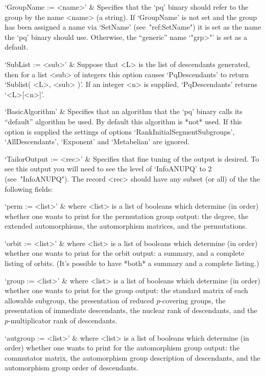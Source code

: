 `GroupName := <name>' &
Specifies that the `pq' binary should refer to  the  group  by  the  name
<name> (a string). If `GroupName' is not  set  and  the  group  has  been
assigned a name via `SetName' (see~"ref:SetName") it is set as  the  name
the `pq' binary should use. Otherwise, the ``generic'' name `"\<grp>"' is
set as a default.

`SubList := <sub>' &
Suppose that <L> is the list of descendants generated, then  for  a  list
<sub> of integers this option causes `PqDescendants' to return  `Sublist(
<L>, <sub> )'. If an integer <n>  is  supplied,  `PqDescendants'  returns
`<L>[<n>]'.

`BasicAlgorithm' &
Specifies that an algorithm that the `pq' binary  calls  its  ``default''
algorithm be used. By default this  algorithm  is  *not*  used.  If  this
option is supplied the settings of options `RankInitialSegmentSubgroups',
`AllDescendants', `Exponent' and `Metabelian' are ignored.

`TailorOutput := <rec>' &
Specifies that fine tuning of the output is desired. To see  this  output
you will need to see the level of `InfoANUPQ' to 2 (see~"InfoANUPQ"). The
record <rec> should have any subset (or all) of the the following fields:

\quad`perm := <list>' &
where <list> is a list of booleans which determine (in order) whether one
wants to print for the permutation group output: the degree, the extended
automorphisms, the automorphism matrices, and the permutations.

\quad`orbit := <list>' &
where <list> is a list of booleans which determine (in order) whether one
wants to print for the orbit output: a summary, and a complete listing of
orbits. (It's possible to have *both* a summary and a complete listing.)

\quad`group := <list>' &
where <list> is a list of booleans which determine (in order) whether one
wants to print  for  the  group  output:  the  standard  matrix  of  each
allowable subgroup, the presentation of reduced $p$-covering groups,  the
presentation of immediate descendants, the nuclear rank  of  descendants,
and the $p$-multiplicator rank of descendants.

\quad`autgroup := <list>' &
where <list> is a list of booleans which determine (in order) whether one
wants to print for the automorphism group output: the commutator  matrix,
the automorphism group description of descendants, and  the  automorphism
group order of descendants.

